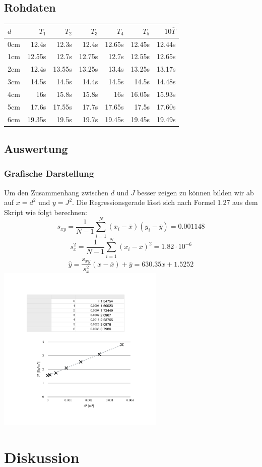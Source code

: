 \documentclass[12pt,a4paper]{article}
\begin{document}
\subsection*{Rohdaten}
\begin{tabular}{|l|r|r|r|r|r|r|}
\hline
$d$&$T_1$&$T_2$&$T_3$&$T_4$&$T_5$&$10\overline{T}$\\
\hline
0cm&12.4s&12.3s&12.4s&12.65s&12.45s&12.44s\\
1cm&12.55s&12.7s&12.75s&12.7s&12.55s&12.65s\\
2cm&12.4s&13.55s&13.25s&13.4s&13.25s&13.17s\\
3cm&14.5s&14.5s&14.4s&14.5s&14.5s&14.48s\\
4cm&16s&15.8s&15.8s&16s&16.05s&15.93s\\
5cm&17.6s&17.55s&17.7s&17.65s&17.5s&17.60s\\
6cm&19.35s&19.5s&19.7s&19.45s&19.45s&19.49s\\
\hline
\end{tabular}

\subsection*{Auswertung}
\subsubsection*{Grafische Darstellung}
Um den Zusammenhang zwischen $d$ und $J$ besser zeigen zu k\"onnen bilden wir ab auf $x = d^2$ und $y = J^2$.
Die Regressionsgerade l\"asst sich nach Formel 1.27 aus dem Skript wie folgt berechnen:
\[ s_{xy} = \frac{1}{N - 1}\sum_{i=1}^{N}(x_i - \overline{x})(y_i - \overline{y}) =  0.001148 \]
\[ s_x^2 = \frac{1}{N - 1}\sum_{i=1}^{N}(x_i - \overline{x})^2 =  1.82\cdot 10^{-6} \]
\[ \hat{y} = \frac{s_{xy}}{s_x^2}(x - \overline{x}) + \overline{y} = 630.35x + 1.5252 \]
\includegraphics[width=8cm]{diagram.pdf}

\section*{Diskussion}
\end{document}
